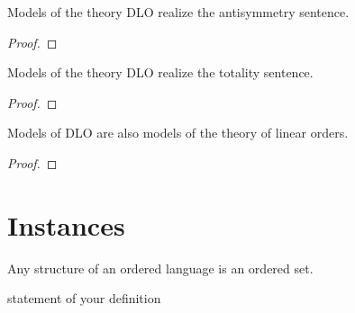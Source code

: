 \begin{lemma}
    \label{lem:models-of-dlo-realize-antisymmetric}
    \leanok
    Models of the theory DLO realize the antisymmetry sentence.
\end{lemma}
\begin{proof}
    \leanok
\end{proof}

\begin{lemma}
    \label{lem:models-of-dlo-realize-total}
    \leanok
    Models of the theory DLO realize the totality sentence.
\end{lemma}
\begin{proof}
    \leanok
\end{proof}

\begin{lemma}
    \label{lem:models-of-dlo-models-of-linear-order-theory}
    \leanok
    Models of DLO are also models of the theory of linear orders.
\end{lemma}
\begin{proof}
    \leanok
\end{proof}



\section{Instances}

\begin{definition}
    \label{def:le-instance-ordered-language}
    \leanok
    Any structure of an ordered language is an ordered set.
\end{definition}

\begin{definition}
    \label{def:preorder-instance-models-of-dlo}
    \leanok
    statement of your definition
\end{definition}

